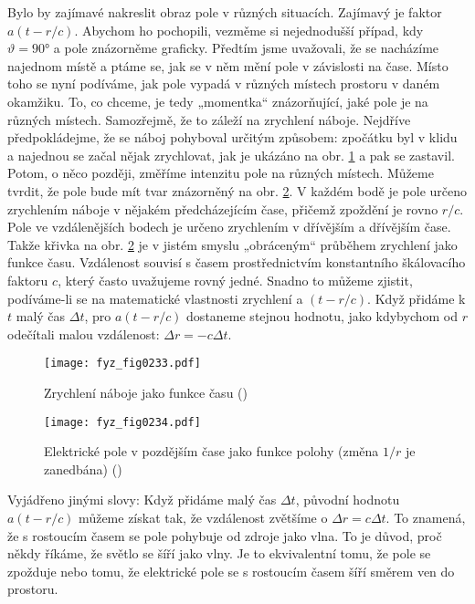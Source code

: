     Bylo by zajímavé nakreslit obraz pole v různých situacích. Zajímavý je faktor \(a(t-r/c)\). 
    Abychom ho pochopili, vezměme si nejednodušší případ, kdy \(\vartheta=\ang{90}\) a pole 
    znázorněme graficky. Předtím jsme uvažovali, že se nacházíme najednom místě a ptáme se, jak se 
    v něm mění pole v závislosti na čase. Místo toho se nyní podíváme, jak pole vypadá v různých 
    místech prostoru v daném okamžiku. To, co chceme, je tedy „momentka“ znázorňující, jaké pole je 
    na různých místech. Samozřejmě, že to záleží na zrychlení náboje. Nejdříve předpokládejme, že 
    se náboj pohyboval určitým způsobem: zpočátku byl v klidu a najednou se začal nějak zrychlovat, 
    jak je ukázáno na obr. \ref{fyz:fig0233} a pak se zastavil. Potom, o něco později, změříme 
    intenzitu pole na různých místech. Můžeme tvrdit, že pole bude mít tvar znázorněný na obr. 
    \ref{fyz:fig0234}. V každém bodě je pole určeno zrychlením náboje v nějakém předcházejícím čase, 
    přičemž zpoždění je rovno \(r/c\). Pole ve vzdálenějších bodech je určeno zrychlením v 
    dřívějším a dřívějším čase. Takže křivka na obr. \ref{fyz:fig0234} je v jistém smyslu 
    „obráceným“ průběhem zrychlení jako funkce času. Vzdálenost souvisí s časem prostřednictvím 
    konstantního škálovacího faktoru \(c\), který často uvažujeme rovný jedné. Snadno to můžeme 
    zjistit, podíváme-li se na matematické vlastnosti zrychlení a \((t-r/c)\). Když přidáme k \(t\) 
    malý čas \(\Delta t\), pro \(a(t - r/c)\) dostaneme stejnou hodnotu, jako kdybychom od \(r\) 
    odečítali malou vzdálenost: \(\Delta r = -c\Delta t\).
    
    \begin{figure}[ht!] %
      \centering
      \texttt{[image: fyz\_fig0233.pdf]}
      \caption{Zrychlení náboje jako funkce času
               (\cite[s.~380]{Feynman01})}
      \label{fyz:fig0233}
    \end{figure}

    \begin{figure}[ht!] %
      \centering
      \texttt{[image: fyz\_fig0234.pdf]}
      \caption{Elektrické pole v pozdějším čase jako funkce polohy (změna \(1/r\) je zanedbána)
               (\cite[s.~380]{Feynman01})}
      \label{fyz:fig0234}
    \end{figure}
    
    Vyjádřeno jinými slovy: Když přidáme malý čas \(\Delta t\), původní hodnotu \(a(t - r/c)\) 
    můžeme získat tak, že vzdálenost zvětšíme o \(\Delta r = c\Delta t\). To znamená, že s 
    rostoucím časem se pole pohybuje od zdroje jako vlna. To je důvod, proč někdy říkáme, že světlo 
    se šíří jako vlny. Je to ekvivalentní tomu, že pole se zpožduje nebo tomu, že elektrické pole 
    se s rostoucím časem šíří směrem ven do prostoru. 
    

